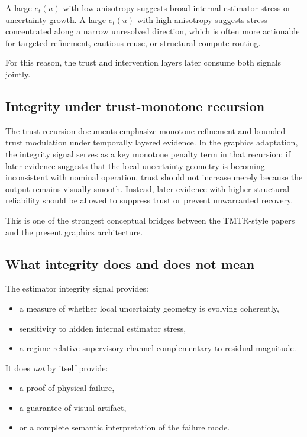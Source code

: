 \documentclass[11pt,letterpaper]{article}
\theoremstyle{gcresult}
\theoremstyle{definition}
\begin{document}
A large $e_t(u)$ with low anisotropy suggests broad internal estimator stress or uncertainty growth. A large $e_t(u)$ with high anisotropy suggests stress concentrated along a narrow unresolved direction, which is often more actionable for targeted refinement, cautious reuse, or structural compute routing.

For this reason, the trust and intervention layers later consume both signals jointly.


\subsection{Integrity under trust-monotone recursion}

The trust-recursion documents emphasize monotone refinement and bounded trust modulation under temporally layered evidence. In the graphics adaptation, the integrity signal serves as a key monotone penalty term in that recursion: if later evidence suggests that the local uncertainty geometry is becoming inconsistent with nominal operation, trust should not increase merely because the output remains visually smooth. Instead, later evidence with higher structural reliability should be allowed to suppress trust or prevent unwarranted recovery.

This is one of the strongest conceptual bridges between the TMTR-style papers and the present graphics architecture. 


\subsection{What integrity does and does not mean}

The estimator integrity signal provides:
\begin{itemize}[leftmargin=1.5em]
    \item a measure of whether local uncertainty geometry is evolving coherently,
    \item sensitivity to hidden internal estimator stress,
    \item a regime-relative supervisory channel complementary to residual magnitude.
\end{itemize}

It does \emph{not} by itself provide:
\begin{itemize}[leftmargin=1.5em]
    \item a proof of physical failure,
    \item a guarantee of visual artifact,
    \item or a complete semantic interpretation of the failure mode.
\end{itemize}
\end{document}
